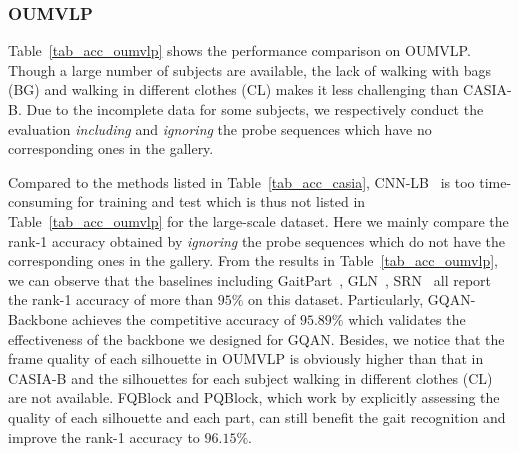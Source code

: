 \subsubsection{OUMVLP}
Table~\ref{tab_acc_oumvlp} shows the performance comparison on OUMVLP.
%
Though a large number of subjects are available, the lack of walking with bags (BG) and walking in different clothes (CL) makes it less challenging than CASIA-B.
%
Due to the incomplete data for some subjects, we respectively conduct the evaluation \emph{including} and \emph{ignoring} the probe sequences which have no corresponding ones in the gallery.

Compared to the methods listed in Table~\ref{tab_acc_casia}, CNN-LB~\cite{wu2016comprehensive} is too time-consuming for training and test which is thus not listed in Table~\ref{tab_acc_oumvlp} for the large-scale dataset.
%
%
%
Here we mainly compare the rank-1 accuracy obtained by \emph{ignoring} the probe sequences which do not have the corresponding ones in the gallery.
%
From the results in Table~\ref{tab_acc_oumvlp}, we can observe that the baselines including GaitPart~\cite{fan2020gaitpart}, GLN~\cite{hou2020gait}, SRN~\cite{hou2021setres} all report the rank-1 accuracy of more than $95\%$ on this dataset.
%
Particularly, GQAN-Backbone achieves the competitive accuracy of $95.89\%$ which validates the effectiveness of the backbone we designed for GQAN.
%
Besides, we notice that the frame quality of each silhouette in OUMVLP is obviously higher than that in CASIA-B and the silhouettes for each subject walking in different clothes (CL) are not available.
%
FQBlock and PQBlock, which work by explicitly assessing the quality of each silhouette and each part, can still benefit the gait recognition and improve the rank-1 accuracy to $96.15\%$.

